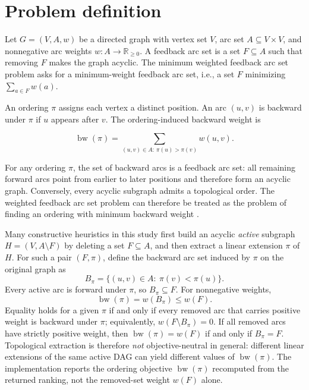 \section{Problem definition}
\label{sec:problem-definition}

Let \(G=(V,A,w)\) be a directed graph with vertex set \(V\), arc set \(A\subseteq V\times V\), and nonnegative arc weights \(w:A\to \mathbb{R}_{\ge 0}\). A feedback arc set is a set \(F\subseteq A\) such that removing \(F\) makes the graph acyclic. The minimum weighted feedback arc set problem asks for a minimum-weight feedback arc set, i.e., a set \(F\) minimizing \(\sum_{a\in F}w(a)\).

An ordering \(\pi\) assigns each vertex a distinct position. An arc \((u,v)\) is backward under \(\pi\) if \(u\) appears after \(v\). The ordering-induced backward weight is

\begin{equation}
    \operatorname{bw}(\pi)
    =
    \sum_{(u,v)\in A:\ \pi(u)>\pi(v)} w(u,v).
    \label{eq:backward-weight}
\end{equation}

For any ordering \(\pi\), the set of backward arcs is a feedback arc set: all remaining forward arcs point from earlier to later positions and therefore form an acyclic graph. Conversely, every acyclic subgraph admits a topological order. The weighted feedback arc set problem can therefore be treated as the problem of finding an ordering with minimum backward weight \cite{F90,K72}.

Many constructive heuristics in this study first build an acyclic \emph{active} subgraph \(H=(V,A\setminus F)\) by deleting a set \(F\subseteq A\), and then extract a linear extension \(\pi\) of \(H\). For such a pair \((F,\pi)\), define the backward arc set induced by \(\pi\) on the original graph as
\begin{equation}
    B_{\pi}
    =
    \{(u,v)\in A:\ \pi(v)<\pi(u)\}.
    \label{eq:backward-set}
\end{equation}
Every active arc is forward under \(\pi\), so \(B_{\pi}\subseteq F\). For nonnegative weights,
\begin{equation}
    \operatorname{bw}(\pi)=w(B_{\pi})\le w(F).
    \label{eq:fas-order-inequality}
\end{equation}
Equality holds for a given \(\pi\) if and only if every removed arc that carries positive weight is backward under \(\pi\); equivalently, \(w(F\setminus B_{\pi})=0\). If all removed arcs have strictly positive weight, then \(\operatorname{bw}(\pi)=w(F)\) if and only if \(B_{\pi}=F\). Topological extraction is therefore \emph{not} objective-neutral in general: different linear extensions of the same active DAG can yield different values of \(\operatorname{bw}(\pi)\). The implementation reports the ordering objective \(\operatorname{bw}(\pi)\) recomputed from the returned ranking, not the removed-set weight \(w(F)\) alone.

